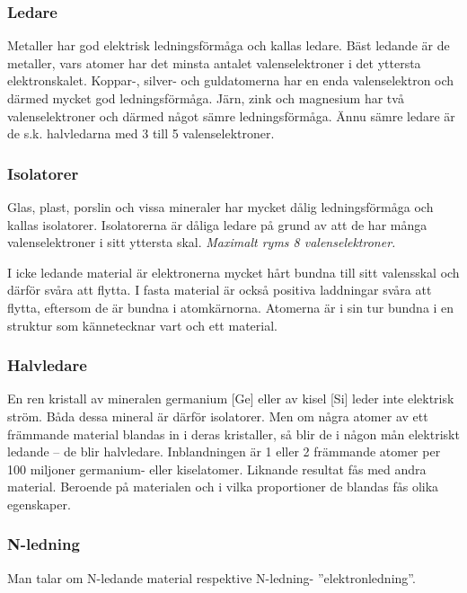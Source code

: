 \subsubsection{Ledare}

Metaller har god elektrisk ledningsförmåga och kallas ledare. Bäst ledande är
de metaller, vars atomer har det minsta antalet valenselektroner i det yttersta
elektronskalet. Koppar-, silver- och guldatomerna har en enda valenselektron
och därmed mycket god ledningsförmåga. Järn, zink och magnesium har två
valenselektroner och därmed något sämre ledningsförmåga. Ännu sämre ledare
är de s.k. halvledarna med 3 till 5 valenselektroner.

\subsubsection{Isolatorer}

Glas, plast, porslin och vissa mineraler har mycket dålig ledningsförmåga och
kallas isolatorer. Isolatorerna är dåliga ledare på grund av att de har många
valenselektroner i sitt yttersta skal. \emph{Maximalt ryms 8 valenselektroner.} 

I icke ledande material är elektronerna mycket hårt bundna till sitt valensskal
och därför svåra att flytta. I fasta material är också positiva laddningar
svåra att flytta, eftersom de är bundna i atomkärnorna. Atomerna är i sin tur
bundna i en struktur som kännetecknar vart och ett material.

\subsubsection{Halvledare}

En ren kristall av mineralen germanium [Ge] eller av kisel [Si] leder
inte elektrisk ström. Båda dessa mineral är därför isolatorer. Men om några
atomer av ett främmande material blandas in i deras kristaller, så blir de i
någon mån elektriskt ledande -- de blir halvledare. Inblandningen är 1 eller 2
främmande atomer per 100 miljoner germanium- eller kiselatomer. Liknande
resultat fås med andra material. Beroende på materialen och i vilka
proportioner de blandas fås olika egenskaper.

\subsubsection{N-ledning}
Man talar om N-ledande material respektive N-ledning- ''elektronledning''.

